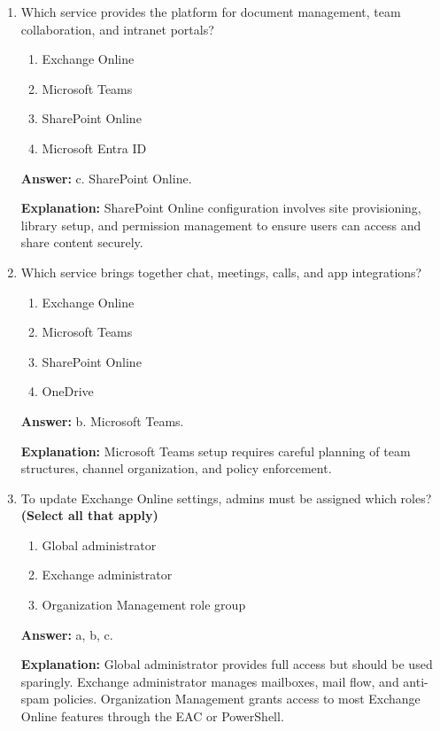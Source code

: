 \documentclass[10pt]{article}
\begin{document}
\begin{enumerate}[leftmargin=*]
\textbf{Explanation:} Exchange Online handles email, calendaring, and mail flow. Administrators must provision mailboxes, set up mail routing, and apply security policies.

\item Which service provides the platform for document management, team collaboration, and intranet portals?
\begin{enumerate}[label=\alph*., leftmargin=1.5em]
\item Exchange Online
\item Microsoft Teams
\item SharePoint Online
\item Microsoft Entra ID
\end{enumerate}
\textbf{Answer:} c. SharePoint Online.

\textbf{Explanation:} SharePoint Online configuration involves site provisioning, library setup, and permission management to ensure users can access and share content securely.

\item Which service brings together chat, meetings, calls, and app integrations?
\begin{enumerate}[label=\alph*., leftmargin=1.5em]
\item Exchange Online
\item Microsoft Teams
\item SharePoint Online
\item OneDrive
\end{enumerate}
\textbf{Answer:} b. Microsoft Teams.

\textbf{Explanation:} Microsoft Teams setup requires careful planning of team structures, channel organization, and policy enforcement.

\item To update Exchange Online settings, admins must be assigned which roles? \textbf{(Select all that apply)}
\begin{enumerate}[label=\alph*., leftmargin=1.5em]
\item Global administrator
\item Exchange administrator
\item Organization Management role group
\end{enumerate}
\textbf{Answer:} a, b, c.

\textbf{Explanation:} Global administrator provides full access but should be used sparingly. Exchange administrator manages mailboxes, mail flow, and anti-spam policies. Organization Management grants access to most Exchange Online features through the EAC or PowerShell.


\end{enumerate}
\end{document}
